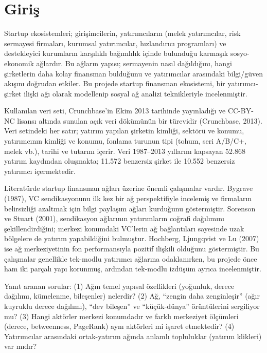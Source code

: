 \documentclass[12pt,a4paper]{article}
\begin{document}
\section{Giriş}

Startup ekosistemleri; girişimcilerin, yatırımcıların (melek yatırımcılar, risk sermayesi firmaları, kurumsal yatırımcılar, hızlandırıcı programları) ve destekleyici kurumların karşılıklı bağımlılık içinde bulunduğu karmaşık sosyo-ekonomik ağlardır. Bu ağların yapısı; sermayenin nasıl dağıldığını, hangi şirketlerin daha kolay finansman bulduğunu ve yatırımcılar arasındaki bilgi/güven akışını doğrudan etkiler. Bu projede startup finansman ekosistemi, bir yatırımcı-şirket ilişki ağı olarak modellenip sosyal ağ analizi teknikleriyle incelenmiştir.

Kullanılan veri seti, Crunchbase'in Ekim 2013 tarihinde yayınladığı ve CC-BY-NC lisansı altında sunulan açık veri dökümünün bir türevidir (Crunchbase, 2013). Veri setindeki her satır; yatırım yapılan şirketin kimliği, sektörü ve konumu, yatırımcının kimliği ve konumu, fonlama turunun tipi (tohum, seri A/B/C+, melek vb.), tarihi ve tutarını içerir. Veri 1987--2013 yıllarını kapsayan 52.868 yatırım kaydından oluşmakta; 11.572 benzersiz şirket ile 10.552 benzersiz yatırımcı içermektedir.

Literatürde startup finansman ağları üzerine önemli çalışmalar vardır. Bygrave (1987), VC sendikasyonunu ilk kez bir ağ perspektifiyle incelemiş ve firmaların belirsizliği azaltmak için bilgi paylaşım ağları kurduğunu göstermiştir. Sorenson ve Stuart (2001), sendikasyon ağlarının yatırımların coğrafi dağılımını şekillendirdiğini; merkezi konumdaki VC'lerin ağ bağlantıları sayesinde uzak bölgelere de yatırım yapabildiğini bulmuştur. Hochberg, Ljungqvist ve Lu (2007) ise ağ merkeziyetinin fon performansıyla pozitif ilişkili olduğunu göstermiştir. Bu çalışmalar genellikle tek-modlu yatırımcı ağlarına odaklanırken, bu projede önce ham iki parçalı yapı korunmuş, ardından tek-modlu izdüşüm ayrıca incelenmiştir.

Yanıt aranan sorular: (1) Ağın temel yapısal özellikleri (yoğunluk, derece dağılımı, kümelenme, bileşenler) nelerdir? (2) Ağ, ``zengin daha zenginleşir'' (ağır kuyruklu derece dağılımı), ``dev bileşen'' ve ``küçük-dünya'' örüntülerini sergiliyor mu? (3) Hangi aktörler merkezi konumdadır ve farklı merkeziyet ölçümleri (derece, betweenness, PageRank) aynı aktörleri mi işaret etmektedir? (4) Yatırımcılar arasındaki ortak-yatırım ağında anlamlı topluluklar (yatırım klikleri) var mıdır?
\end{document}
